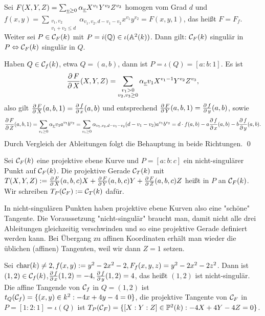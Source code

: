 \begin{lemma}
	Sei $F(X,Y,Z) = \sum_{\uline{v} \geq 0} \alpha_{\uline{v}} X^{v_1} Y^{v_2} Z^{v_3}$ homogen vom Grad $d$ und $f(x,y) = \sum_{\substack{v_1,v_2 \\ v_1 + v_2 \leq d}} \alpha_{v_1,v_2,d-v_1-v_2}x^{v_1} y^{v_2} = F(x,y,1)$, das heißt $F = F_f$. 
	Weiter sei $P \in \mathcal{C}_F(k)$ mit $P = i(\mathbb{Q}) \in \iota(\mathbb{A}^2(k))$. 
	Dann gilt: $\mathcal{C}_F(k)$ singulär in $P \Leftrightarrow \mathcal{C}_F(k)$ singulär in $Q$.
\end{lemma}

	Haben $Q \in \mathcal{C}_f(k)$, etwa $Q = (a,b)$, dann ist $P = \iota(Q) = [a:b:1]$. 
	Es ist
	\[ \frac{\der F}{\der X}(X,Y,Z) = \sum_{\substack{v_1 > 0 \\ v_2, v_3 \geq 0}} \alpha_{\uline{v}} v_1 X^{v_1-1} Y^{v_2} Z^{v_3}, \]
	also gilt $\frac{\operatorname{\partial} F}{\operatorname{\partial} X}(a,b,1) = \frac{\operatorname{\partial} f}{\operatorname{\partial} x}(a,b)$ und entsprechend $\frac{\operatorname{\partial} F}{\operatorname{\partial} Y}(a,b,1) = \frac{\operatorname{\partial} f}{\operatorname{\partial} y}(a,b)$, sowie
	\[ \frac{\der F}{\der Z}(a,b,1) = \sum_{v_i \geq 0} \alpha_{\uline{v}} v_3 a^{v_1} b^{v_2} = \sum_{v_i \geq 0} \alpha_{v_1,v_2,d-v_1-v_2} (d-v_1-v_2) a^{v_1} b^{v_2} = d \cdot f(a,b) - a\frac{\der f}{\der x}(a,b) - b \frac{\der f}{\der y}(a,b). \]
	Durch Vergleich der Ableitungen folgt die Behauptung in beide Richtungen. \qed
	
\begin{defn}[Tangente]
	Sei $\mathcal{C}_F(k)$ eine projektive ebene Kurve und $P = [a:b:c]$ ein nicht-singulärer Punkt auf $\mathcal{C}_F(k)$. 
	Die projektive Gerade $\mathcal{C}_T(k)$ mit $T(X,Y,Z) := \frac{\operatorname{\partial} F}{\operatorname{\partial} X}(a,b,c)X  + \frac{\operatorname{\partial} F}{\operatorname{\partial} Y}(a,b,c)Y + \frac{\operatorname{\partial} F}{\operatorname{\partial} Z}(a,b,c)Z$ heißt  in $P$ an $\mathcal{C}_F(k)$. 
	Wir schreiben $T_P(\mathcal{C}_F) := \mathcal{C}_T(k)$ dafür.
\end{defn}

\begin{bem}
	In nicht-singulären Punkten haben projektive ebene Kurven also eine "schöne" Tangente. 
	Die Voraussetzung "nicht-singulär" braucht man, damit nicht alle drei Ableitungen gleichzeitig verschwinden und so eine projektive Gerade definiert werden kann. 
	Bei Übergang zu affinen Koordinaten erhält man wieder die üblichen (affinen) Tangenten, weil wir dann $Z = 1$ setzen.
\end{bem}

\begin{bsp}
	Sei $\operatorname{char}(k) \neq 2, f(x,y) := y^2 - 2x^2 - 2, F_f(x,y,z) = y^2-2x^2-2z^2$. 
	Dann ist $(1,2) \in \mathcal{C}_f(k)$,\linebreak $\frac{\operatorname{\partial} f}{\operatorname{\partial} x}(1,2) = -4, \frac{\operatorname{\partial} f}{\operatorname{\partial} y}(1,2) = 4$, das heißt $(1,2)$ ist nicht-singulär. 
	Die affine Tangende von $\mathcal{C}_f$ in $Q = (1,2)$ ist $t_Q(\mathcal{C}_f) = \{(x,y) \in k^2 : -4x + 4y - 4 = 0\}$, die projektive Tangente von $\mathcal{C}_F$ in $P = [1:2:1] = \iota(Q)$ ist $T_P(\mathcal{C}_F) = \{[X:Y:Z] \in \mathbb{P}^2(k) : -4X + 4Y - 4Z = 0\}$.
\end{bsp}

